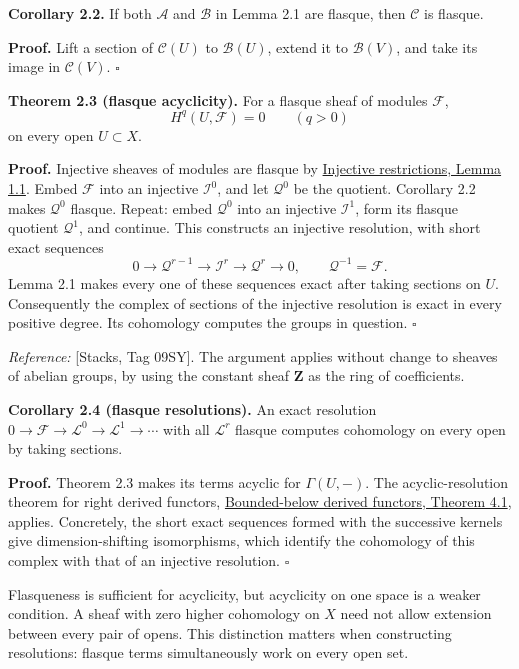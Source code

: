 \documentclass[11pt]{article}
\begin{document}
\textbf{Corollary 2.2.} If both \(\mathcal A\) and \(\mathcal B\) in
Lemma 2.1 are flasque, then \(\mathcal C\) is flasque.

\textbf{Proof.} Lift a section of \(\mathcal C(U)\) to
\(\mathcal B(U)\), extend it to \(\mathcal B(V)\), and take its image in
\(\mathcal C(V)\). \(\square\)

\textbf{Theorem 2.3 (flasque acyclicity).} For a flasque sheaf of
modules \(\mathcal F\), \[
H^q(U,\mathcal F)=0\qquad(q>0)
\] on every open \(U\subset X\).

\textbf{Proof.} Injective sheaves of modules are flasque by
\href{../derived-categories-and-sheaf-operations/injective-modules-and-bounded-below-derived-functors.html\#1-extending-maps-and-extending-sections}{Injective
restrictions, Lemma 1.1}. Embed \(\mathcal F\) into an injective
\(\mathcal I^0\), and let \(\mathcal Q^0\) be the quotient. Corollary
2.2 makes \(\mathcal Q^0\) flasque. Repeat: embed \(\mathcal Q^0\) into
an injective \(\mathcal I^1\), form its flasque quotient
\(\mathcal Q^1\), and continue. This constructs an injective resolution,
with short exact sequences \[
0\to\mathcal Q^{r-1}\to\mathcal I^r\to\mathcal Q^r\to0,
\qquad\mathcal Q^{-1}=\mathcal F.
\] Lemma 2.1 makes every one of these sequences exact after taking
sections on \(U\). Consequently the complex of sections of the injective
resolution is exact in every positive degree. Its cohomology computes
the groups in question. \(\square\)

\emph{Reference:} {[}Stacks, Tag 09SY{]}. The argument applies without
change to sheaves of abelian groups, by using the constant sheaf
\(\mathbf Z\) as the ring of coefficients.

\textbf{Corollary 2.4 (flasque resolutions).} An exact resolution
\(0\to\mathcal F\to\mathcal L^0\to\mathcal L^1\to\cdots\) with all
\(\mathcal L^r\) flasque computes cohomology on every open by taking
sections.

\textbf{Proof.} Theorem 2.3 makes its terms acyclic for \(\Gamma(U,-)\).
The acyclic-resolution theorem for right derived functors,
\href{../derived-categories-and-sheaf-operations/injective-modules-and-bounded-below-derived-functors.html\#4-right-derived-functors-on-bounded-below-complexes}{Bounded-below
derived functors, Theorem 4.1}, applies. Concretely, the short exact
sequences formed with the successive kernels give dimension-shifting
isomorphisms, which identify the cohomology of this complex with that of
an injective resolution. \(\square\)

Flasqueness is sufficient for acyclicity, but acyclicity on one space is
a weaker condition. A sheaf with zero higher cohomology on \(X\) need
not allow extension between every pair of opens. This distinction
matters when constructing resolutions: flasque terms simultaneously work
on every open set.
\end{document}
